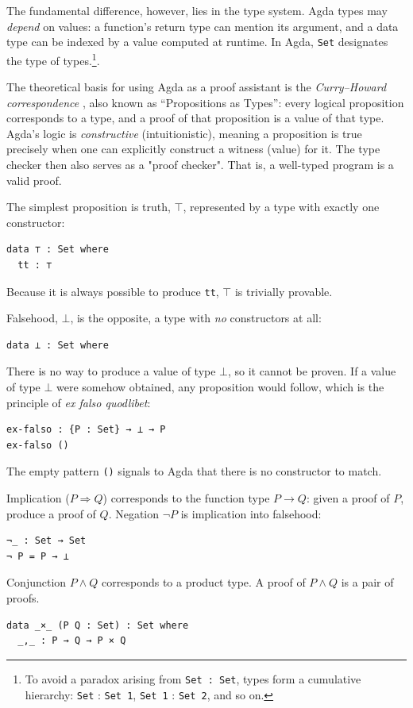The fundamental difference, however, lies in the type system. Agda types may \textit{depend} on values: a function's return type can mention its argument, and a data type can be indexed by a value computed at runtime.
In Agda, \texttt{Set} designates the type of types.\footnote{To avoid a paradox arising from \texttt{Set : Set}, types form a cumulative hierarchy: \texttt{Set} : \texttt{Set 1}, \texttt{Set 1} : \texttt{Set 2}, and so on.}.

The theoretical basis for using Agda as a proof assistant is the \textit{Curry--Howard correspondence} \cite{propositionsastypes}, also known as ``Propositions as Types'': every logical proposition corresponds to a type, and a proof of that proposition is a value of that type.
Agda's logic is \textit{constructive} (intuitionistic), meaning a proposition is true precisely when one can explicitly construct a witness (value) for it.
The type checker then also serves as a "proof checker". That is, a well-typed program is a valid proof.

The simplest proposition is truth, $\top$, represented by a type with exactly one constructor:
\begin{verbatim}
data ⊤ : Set where
  tt : ⊤
\end{verbatim}
Because it is always possible to produce \texttt{tt}, $\top$ is trivially provable.

Falsehood, $\bot$, is the opposite, a type with \textit{no} constructors at all:
\begin{verbatim}
data ⊥ : Set where
\end{verbatim}
There is no way to produce a value of type $\bot$, so it cannot be proven.
If a value of type $\bot$ were somehow obtained, any proposition would follow, which is the principle of \textit{ex falso quodlibet}:
\begin{verbatim}
ex-falso : {P : Set} → ⊥ → P
ex-falso ()
\end{verbatim}
The empty pattern \texttt{()} signals to Agda that there is no constructor to match.

Implication ($P \Rightarrow Q$) corresponds to the function type $P \to Q$: given a proof of $P$, produce a proof of $Q$.
Negation $\neg P$ is implication into falsehood:
\begin{verbatim}
¬_ : Set → Set
¬ P = P → ⊥
\end{verbatim}

Conjunction $P \land Q$ corresponds to a product type. A proof of $P \land Q$ is a pair of proofs.
\begin{verbatim}
data _×_ (P Q : Set) : Set where
  _,_ : P → Q → P × Q
\end{verbatim}

